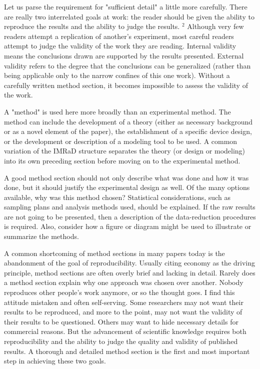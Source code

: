Let us parse the requirement for "sufficient detail" a little more carefully. There are really two interrelated goals at work: the reader should be given the ability to reproduce the results and the ability to judge the results. ${ }^{2}$ Although very few readers attempt a replication of another's experiment, most careful readers attempt to judge the validity of the work they are reading. Internal validity means the conclusions drawn are supported by the results presented. External validity refers to the degree that the conclusions can be generalized (rather than being applicable only to the narrow confines of this one work). Without a carefully written method section, it becomes impossible to assess the validity of the work.

A "method" is used here more broadly than an experimental method. The method can include the development of a theory (either as necessary background or as a novel element of the paper), the establishment of a specific device design, or the development or description of a modeling tool to be used. A common variation of the IMRaD structure separates the theory (or design or modeling) into its own preceding section before moving on to the experimental method.

A good method section should not only describe what was done and how it was done, but it should justify the experimental design as well. Of the many options available, why was this method chosen? Statistical considerations, such as sampling plans and analysis methods used, should be explained. If the raw results are not going to be presented, then a description of the data-reduction procedures is required. Also, consider how a figure or diagram might be used to illustrate or summarize the methods.

A common shortcoming of method sections in many papers today is the abandonment of the goal of reproducibility. Usually citing economy as the driving principle, method sections are often overly brief and lacking in detail. Rarely does a method section explain why one approach was chosen over another. Nobody reproduces other people's work anymore, or so the thought goes. I find this attitude mistaken and often self-serving. Some researchers may not want their results to be reproduced, and more to the point, may not want the validity of their results to be questioned. Others may want to hide necessary details for commercial reasons. But the advancement of scientific knowledge requires both reproducibility and the ability to judge the quality and validity of published results. A thorough and detailed method section is the first and most important step in achieving these two goals.

